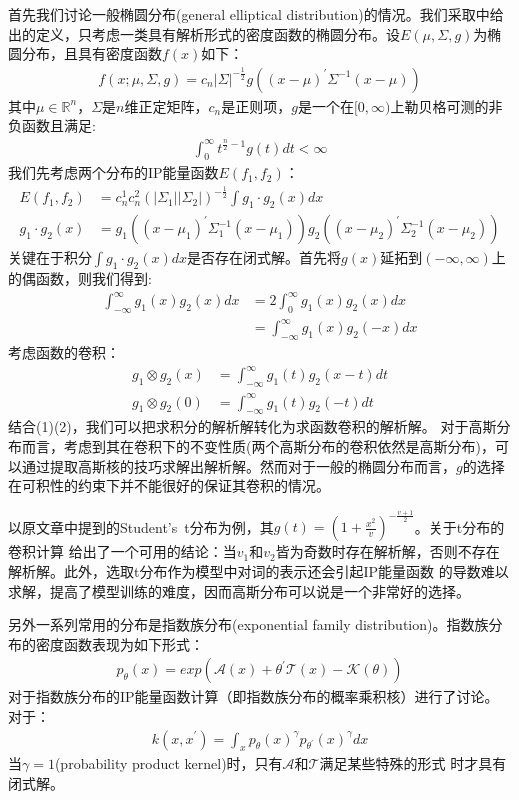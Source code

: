 \documentclass[a4paper,13pt]{article}
\begin{document}
\begin{spacing}{1.5}
首先我们讨论一般椭圆分布(general elliptical distribution)的情况。我们采取\cite{gomez2003survey}中给出的定义，只考虑一类具有解析形式的密度函数的椭圆分布。设$E(\mu,\Sigma,g)$为椭圆分布，且具有密度函数$f(x)$如下：
\begin{align*}
f(x;\mu,\Sigma,g)=c_n|\Sigma|^{-\frac{1}{2}}g((x-\mu)^{\prime{}}\Sigma^{-1}(x-\mu))
\end{align*}
其中$\mu\in\mathbb{R}^n$，$\Sigma$是$n$维正定矩阵，$c_n$是正则项，$g$是一个在$[0,\infty)$上勒贝格可测的非负函数且满足:
\begin{align*}
\int_0^{\infty}t^{\frac{n}{2}-1}g(t)dt<\infty
\end{align*}
我们先考虑两个分布的IP能量函数$E(f_1,f_2)$：
\begin{align*}
E(f_1,f_2)&=c_n^1c_n^2(|\Sigma_1||\Sigma_2|)^{-\frac{1}{2}}\int g_1\cdot g_2(x)dx \\
g_1 \cdot g_2(x)&=g_1((x-\mu_1)^{\prime{}}\Sigma_1^{-1}(x-\mu_1))g_2((x-\mu_2)^{\prime{}}\Sigma_2^{-1}(x-\mu_2))
\end{align*}
关键在于积分$\int g_1\cdot g_2(x)dx$是否存在闭式解。首先将$g(x)$延拓到$(-\infty,\infty)$上的偶函数，则我们得到:
\begin{align*}
\int_{-\infty}^{\infty}g_1(x)g_2(x)dx&=2\int_{0}^{\infty}g_1(x)g_2(x)dx \\
&=\int_{-\infty}^{\infty}g_1(x)g_2(-x)dx
\end{align*}
考虑函数的卷积：
\begin{align*}
g_1\otimes g_2(x)&= \int_{-\infty}^{\infty} g_1(t)g_2(x-t)dt \\
g_1\otimes g_2(0)&= \int_{-\infty}^{\infty} g_1(t)g_2(-t)dt   
\end{align*}
结合(1)(2)，我们可以把求积分的解析解转化为求函数卷积的解析解。
对于高斯分布而言，考虑到其在卷积下的不变性质(两个高斯分布的卷积依然是高斯分布)，可以通过提取高斯核的技巧求解出解析解。然而对于一般的椭圆分布而言，$g$的选择在可积性的约束下并不能很好的保证其卷积的情况。

以原文章中提到的Student's\ t分布为例，其$g(t)=(1+\frac{x^2}{v})^{-\frac{v+1}{2}}$。关于t分布的卷积计算
\cite{nadarajah2005convolutions}给出了一个可用的结论：当$v_1$和$v_2$皆为奇数时存在解析解，否则不存在解析解。此外，选取t分布作为模型中对词的表示还会引起IP能量函数
的导数难以求解，提高了模型训练的难度，因而高斯分布可以说是一个非常好的选择。

另外一系列常用的分布是指数族分布(exponential family distribution)。指数族分布的密度函数表现为如下形式：
\begin{align*}
p_{\theta}(x)=exp(\mathcal{A}(x)+\theta^{\prime{}}\mathcal{T}(x)-\mathcal{K}(\theta))
\end{align*}
\cite{jebara2004probability}对于指数族分布的IP能量函数计算（即指数族分布的概率乘积核）进行了讨论。对于：
\begin{align*}
k(x,x^{\prime{}})=\int_x p_\theta(x)^{\gamma} p_{\theta^{\prime{}}}(x)^{\gamma}dx
\end{align*}
当$\gamma=1$(probability product kernel)时，只有$\mathcal{A}$和$\mathcal{T}$满足某些特殊的形式
时才具有闭式解。


\end{spacing}
\end{document}
